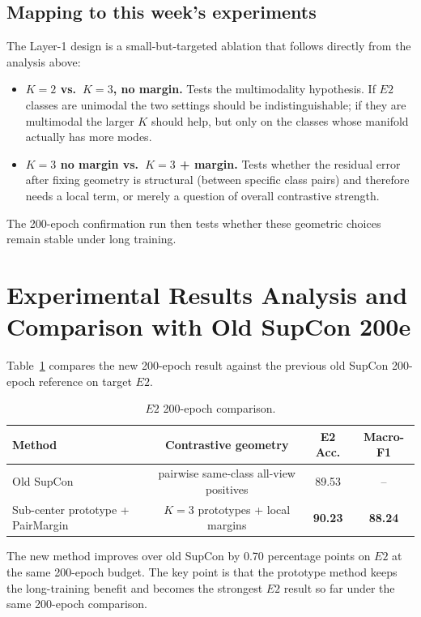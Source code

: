 \documentclass[11pt]{article}
\begin{document}
\subsection*{Mapping to this week's experiments}

The Layer-1 design is a small-but-targeted ablation that follows directly from the analysis above:
\begin{itemize}[leftmargin=*]
  \item \textbf{$K=2$ vs.\ $K=3$, no margin.} Tests the multimodality hypothesis. If $E2$ classes are unimodal the two settings should be indistinguishable; if they are multimodal the larger $K$ should help, but only on the classes whose manifold actually has more modes.
  \item \textbf{$K=3$ no margin vs.\ $K=3$ + margin.} Tests whether the residual error after fixing geometry is structural (between specific class pairs) and therefore needs a local term, or merely a question of overall contrastive strength.
\end{itemize}

The 200-epoch confirmation run then tests whether these geometric choices remain stable under long training.

\section{Experimental Results Analysis and Comparison with Old SupCon 200e}

Table~\ref{tab:e2_200e} compares the new 200-epoch result against the previous old SupCon 200-epoch reference on target $E2$.

\begin{table}[H]
\centering
\caption{$E2$ 200-epoch comparison.}
\label{tab:e2_200e}
\small
\begin{tabular}{lccc}
\toprule
Method & Contrastive geometry & E2 Acc. & Macro-F1 \\
\midrule
Old SupCon & pairwise same-class all-view positives & 89.53 & -- \\
Sub-center prototype + PairMargin & $K=3$ prototypes + local margins & \textbf{90.23} & \textbf{88.24} \\
\bottomrule
\end{tabular}
\end{table}

\noindent The new method improves over old SupCon by 0.70 percentage points on $E2$ at the same 200-epoch budget. The key point is that the prototype method keeps the long-training benefit and becomes the strongest $E2$ result so far under the same 200-epoch comparison.
\end{document}
